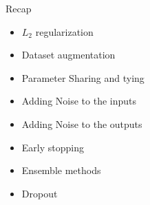 \documentclass[serif,aspectratio=169]{beamer}
\begin{document}
\begin{frame}
	\vspace{4em}
	\begin{overlayarea}{\textwidth}{\textheight}
		\begin{block}{Recap}
			\begin{itemize}
				\item $L_2$ regularization
				\item Dataset augmentation
				\item Parameter Sharing and tying
				\item Adding Noise to the inputs
				\item Adding Noise to the outputs 
				\item Early stopping
				\item Ensemble methods
				\item Dropout
			\end{itemize}
		\end{block}
	\end{overlayarea}
\end{frame}
				
\end{document}
